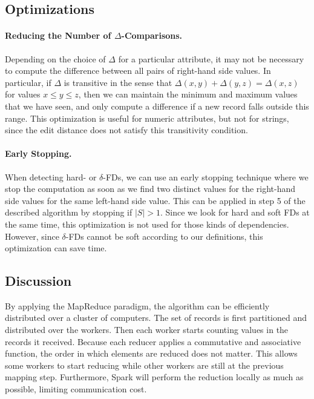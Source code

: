 \documentclass{article}
\begin{document}
    \subsection{Optimizations}
    
    \paragraph{Reducing the Number of $\Delta$-Comparisons.} Depending on the choice of $\Delta$ for a particular attribute, it may not be necessary to compute the difference between all pairs of right-hand side values. In particular, if $\Delta$ is transitive in the sense that $\Delta(x, y) + \Delta(y, z) = \Delta(x, z)$ for values $x \leq y \leq z$, then we can maintain the minimum and maximum values that we have seen, and only compute a difference if a new record falls outside this range. This optimization is useful for numeric attributes, but not for strings, since the edit distance does not satisfy this transitivity condition.
    
    \paragraph{Early Stopping.} When detecting hard- or $\delta$-FDs, we can use an early stopping technique where we stop the computation as soon as we find two distinct values for the right-hand side values for the same left-hand side value. This can be applied in step 5 of the described algorithm by stopping if $|S| > 1$. Since we look for hard and soft FDs at the same time, this optimization is not used for those kinds of dependencies. However, since $\delta$-FDs cannot be soft according to our definitions, this optimization can save time.
    
    
    \subsection{Discussion}
    
    By applying the MapReduce paradigm, the algorithm can be efficiently distributed over a cluster of computers. The set of records is first partitioned and distributed over the workers. Then each worker starts counting values in the records it received. Because each reducer applies a commutative and associative function, the order in which elements are reduced does not matter. This allows some workers to start reducing while other workers are still at the previous mapping step. Furthermore, Spark will perform the reduction locally as much as possible, limiting communication cost.
    
\end{document}
